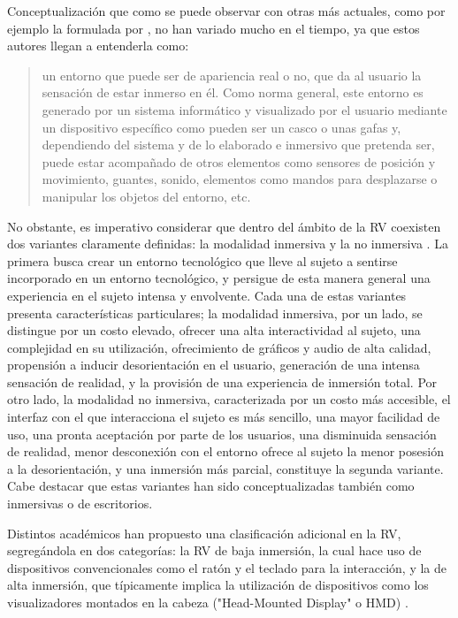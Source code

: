 \documentclass[spanish]{textolivre}
\begin{document}
Conceptualización que como se puede observar con otras más actuales, como por ejemplo la formulada por \textcite{navarro2019realidad}, no han variado mucho en el tiempo, ya que estos autores llegan a entenderla como:

\begin{quote}
un entorno que puede ser de apariencia real o no, que da al usuario la sensación de estar inmerso en él. Como norma general, este entorno es generado por un sistema informático y visualizado por el usuario mediante un dispositivo específico como pueden ser un casco o unas gafas y, dependiendo del sistema y de lo elaborado e inmersivo que pretenda ser, puede estar acompañado de otros elementos como sensores de posición y movimiento, guantes, sonido, elementos como mandos para desplazarse o manipular los objetos del entorno, etc. \cite[p.~37]{navarro2019realidad}
\end{quote}
 

No obstante, es imperativo considerar que dentro del ámbito de la RV coexisten dos variantes claramente definidas: la modalidad inmersiva y la no inmersiva \cite{caballero_2020}. La primera busca crear un entorno tecnológico que lleve al sujeto a sentirse incorporado en un entorno tecnológico, y persigue de esta manera general una experiencia en el sujeto intensa y envolvente. Cada una de estas variantes presenta características particulares; la modalidad inmersiva, por un lado, se distingue por un costo elevado, ofrecer una alta interactividad al sujeto, una complejidad en su utilización, ofrecimiento de gráficos y audio de alta calidad, propensión a inducir desorientación en el usuario, generación de una intensa sensación de realidad, y la provisión de una experiencia de inmersión total. Por otro lado, la modalidad no inmersiva, caracterizada por un costo más accesible, el interfaz con el que interacciona el sujeto es más sencillo, una mayor facilidad de uso, una pronta aceptación por parte de los usuarios, una disminuida sensación de realidad, menor desconexión con el entorno ofrece al sujeto la menor posesión a la desorientación, y una inmersión más parcial, constituye la segunda variante. Cabe destacar que estas variantes han sido conceptualizadas también como inmersivas o de escritorios. 

Distintos académicos han propuesto una clasificación adicional en la RV, segregándola en dos categorías: la RV de baja inmersión, la cual hace uso de dispositivos convencionales como el ratón y el teclado para la interacción, y la de alta inmersión, que típicamente implica la utilización de dispositivos como los visualizadores montados en la cabeza ("Head-Mounted Display" o HMD) \cite{mulders2020framework}.
\end{document}
